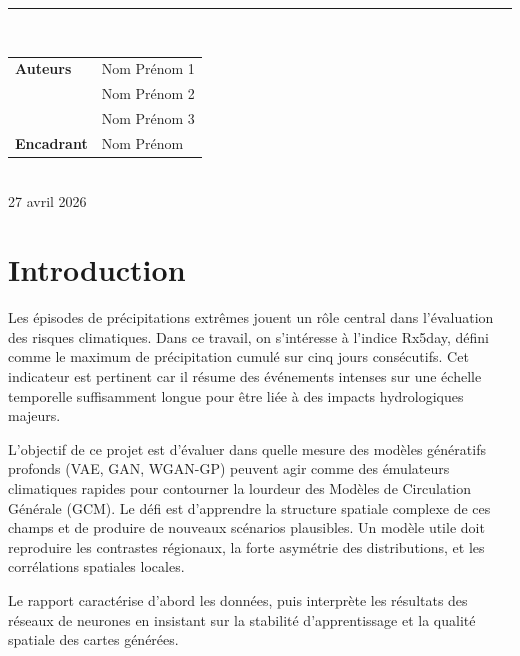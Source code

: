 \documentclass[11pt,a4paper]{article}
\begin{document}
\begin{titlepage}
    \vfill

    \begin{center}
        \begin{minipage}{0.72\textwidth}
            \centering
            {\color{rainblue}\rule{\linewidth}{1pt}}\\[0.35cm]
            \begin{tabular}{@{}ll@{}}
                \textbf{Auteurs} & Nom Prénom 1 \\
                                  & Nom Prénom 2 \\
                                  & Nom Prénom 3 \\[0.25cm]
                \textbf{Encadrant} & Nom Prénom \\
            \end{tabular}\\[0.35cm]
            {\color{slategray}\small 27 avril 2026}
        \end{minipage}
    \end{center}
\end{titlepage}
\clearpage
{}
\hypersetup{pageanchor=true}

\section{Introduction}

Les épisodes de précipitations extrêmes jouent un rôle central dans l'évaluation des risques climatiques. Dans ce travail, on s'intéresse à l'indice Rx5day, défini comme le maximum de précipitation cumulé sur cinq jours consécutifs. Cet indicateur est pertinent car il résume des événements intenses sur une échelle temporelle suffisamment longue pour être liée à des impacts hydrologiques majeurs.

L'objectif de ce projet est d'évaluer dans quelle mesure des modèles génératifs profonds (VAE, GAN, WGAN-GP) peuvent agir comme des émulateurs climatiques rapides pour contourner la lourdeur des Modèles de Circulation Générale (GCM). Le défi est d'apprendre la structure spatiale complexe de ces champs et de produire de nouveaux scénarios plausibles. Un modèle utile doit reproduire les contrastes régionaux, la forte asymétrie des distributions, et les corrélations spatiales locales. 

Le rapport caractérise d'abord les données, puis interprète les résultats des réseaux de neurones en insistant sur la stabilité d'apprentissage et la qualité spatiale des cartes générées.
\end{document}
